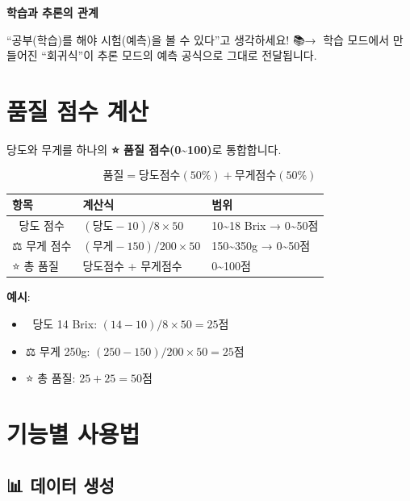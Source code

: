 \documentclass[11pt,a4paper]{article}
\begin{document}
\begin{tipbox}
\textbf{학습과 추론의 관계}

``공부(학습)를 해야 시험(예측)을 볼 수 있다''고 생각하세요! 📚→📝
학습 모드에서 만들어진 ``회귀식''이 추론 모드의 예측 공식으로 그대로 전달됩니다.
\end{tipbox}

\section{품질 점수 계산}

당도와 무게를 하나의 \textbf{⭐ 품질 점수(0\textasciitilde100)}로 통합합니다.

\[
\text{품질} = \text{당도점수}(50\%) + \text{무게점수}(50\%)
\]

\begin{center}
\begin{tabular}{lll}
\toprule
\textbf{항목} & \textbf{계산식} & \textbf{범위} \\
\midrule
🍯 당도 점수 & $(\text{당도} - 10) / 8 \times 50$ & 10\textasciitilde18 Brix → 0\textasciitilde50점 \\
⚖️ 무게 점수 & $(\text{무게} - 150) / 200 \times 50$ & 150\textasciitilde350g → 0\textasciitilde50점 \\
\midrule
⭐ 총 품질 & 당도점수 + 무게점수 & 0\textasciitilde100점 \\
\bottomrule
\end{tabular}
\end{center}

\textbf{예시}:
\begin{itemize}
    \item 🍯 당도 14 Brix: $(14 - 10) / 8 \times 50 = 25$점
    \item ⚖️ 무게 250g: $(250 - 150) / 200 \times 50 = 25$점
    \item ⭐ 총 품질: $25 + 25 = 50$점
\end{itemize}

\section{기능별 사용법}

\subsection{📊 데이터 생성}
\end{document}
